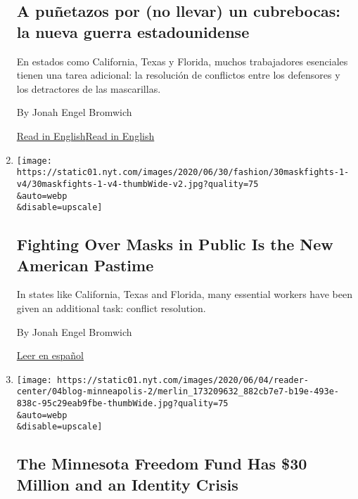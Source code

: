 \begin{enumerate}
{  \subsection{A puñetazos por (no llevar) un cubrebocas: la nueva guerra
  estadounidense}\label{a-puuxf1etazos-por-no-llevar-un-cubrebocas-la-nueva-guerra-estadounidense}}

  En estados como California, Texas y Florida, muchos trabajadores
  esenciales tienen una tarea adicional: la resolución de conflictos
  entre los defensores y los detractores de las mascarillas.

  By Jonah Engel Bromwich

  \href{https://www.nytimes.com/2020/06/30/style/mask-america-freedom-coronavirus.html}{Read
  in
  English}\href{https://www.nytimes.com/2020/06/30/style/mask-america-freedom-coronavirus.html}{Read
  in English}
\item
  \href{/2020/06/30/style/mask-america-freedom-coronavirus.html}{}

  \texttt{[image: https://static01.nyt.com/images/2020/06/30/fashion/30maskfights-1-v4/30maskfights-1-v4-thumbWide-v2.jpg?quality=75\\\&auto=webp\\\&disable=upscale]}

  \hypertarget{fighting-over-masks-in-public-is-the-new-american-pastime}{%
  \subsection{Fighting Over Masks in Public Is the New American
  Pastime}\label{fighting-over-masks-in-public-is-the-new-american-pastime}}

  In states like California, Texas and Florida, many essential workers
  have been given an additional task: conflict resolution.

  By Jonah Engel Bromwich

  \href{https://www.nytimes.com/es/2020/07/02/espanol/cubrebocas-pelea-tiendas-video.html}{Leer
  en español}
\item
  \href{/2020/06/16/style/minnesota-freedom-fund-donations.html}{}

  \texttt{[image: https://static01.nyt.com/images/2020/06/04/reader-center/04blog-minneapolis-2/merlin\_173209632\_882cb7e7-b19e-493e-838c-95c29eab9fbe-thumbWide.jpg?quality=75\\\&auto=webp\\\&disable=upscale]}

  \hypertarget{the-minnesota-freedom-fund-has-30-million-and-an-identity-crisis}{%
  \subsection{The Minnesota Freedom Fund Has \$30 Million and an
  Identity
  Crisis}\label{the-minnesota-freedom-fund-has-30-million-and-an-identity-crisis}}


\end{enumerate}
